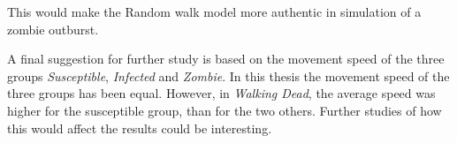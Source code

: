 \documentclass[%
twoside,                 %
final,                   %
chapterprefix=true,      %
open=right               %
10pt]{book}
\newcommand{\clearemptydoublepage}{\clearpage{\pagestyle{empty}\cleardoublepage}}
\begin{document}
\noindent
This would make the Random walk model more authentic in simulation of a zombie outburst.


\vspace{3mm}




\vspace{3mm}


A final suggestion for further study is based on the movement speed of the three groups \emph{Susceptible}, \emph{Infected} and \emph{Zombie}. In this thesis the movement speed of the three groups has been equal. However, in \emph{Walking Dead}, the average speed was higher for the susceptible group, than for the two others. Further studies of how this would affect the results could be interesting.









\clearemptydoublepage
{}
\thispagestyle{empty}







\clearemptydoublepage
{}
\thispagestyle{empty}
\printindex
\end{document}
